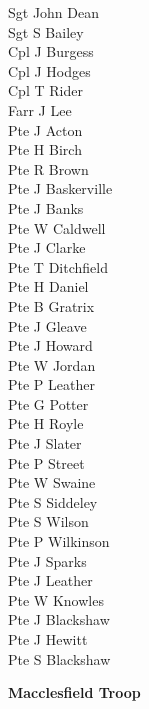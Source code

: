 \begin{multicols}{2}
  \small
  \noindent
  Sgt John Dean \\
  Sgt S Bailey \\
  Cpl J Burgess \\
  Cpl J Hodges \\
  Cpl T Rider \\
  Farr J Lee \\
  Pte J Acton \\
  Pte H Birch \\
  Pte R Brown \\
  Pte J Baskerville \\
  Pte J Banks \\
  Pte W Caldwell \\
  Pte J Clarke \\
  Pte T Ditchfield \\
  Pte H Daniel \\
  Pte B Gratrix \\
  Pte J Gleave \\
  Pte J Howard \\
  Pte W Jordan \\
  Pte P Leather \\
  Pte G Potter \\
  Pte H Royle \\
  Pte J Slater \\
  Pte P Street \\
  Pte W Swaine \\
  Pte S Siddeley \\
  Pte S Wilson \\
  Pte P Wilkinson \\
  Pte J Sparks \\
  Pte J Leather \\
  Pte W Knowles \\
  Pte J Blackshaw \\
  Pte J Hewitt \\
  Pte S Blackshaw \\
\end{multicols}

\vspace*{10mm}

\begin{center}
  \Large
  \textbf{Macclesfield Troop}
\end{center}

\vspace*{10mm}

